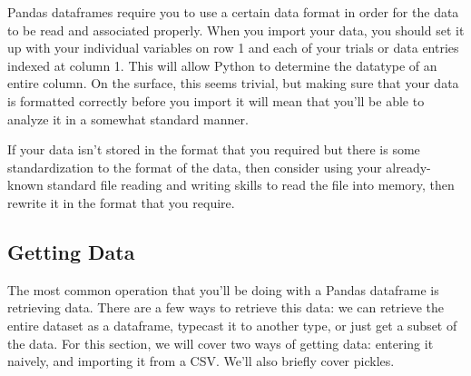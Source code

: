Pandas dataframes require you to use a certain data format in order for the data to be read and associated properly. When you import your data, you should set it up with your individual variables on row 1 and each of your trials or data entries indexed at column 1. This will allow Python to determine the datatype of an entire column. On the surface, this seems trivial, but making sure that your data is formatted correctly before you import it will mean that you'll be able to analyze it in a somewhat standard manner.\par
If your data isn't stored in the format that you required but there is some standardization to the format of the data, then consider using your already-known standard file reading and writing skills to read the file into memory, then rewrite it in the format that you require.\par
\subsection{Getting Data}
The most common operation that you'll be doing with a Pandas dataframe is retrieving data. There are a few ways to retrieve this data: we can retrieve the entire dataset as a dataframe, typecast it to another type, or just get a subset of the data. For this section, we will cover two ways of getting data: entering it naively, and importing it from a CSV. We'll also briefly cover pickles.
